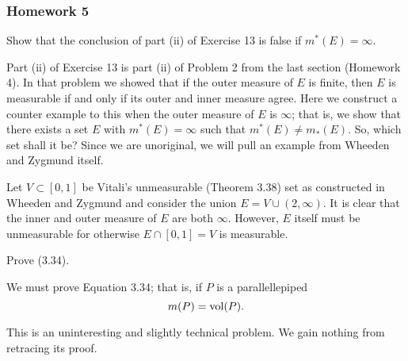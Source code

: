 \subsubsection{Homework 5}
\setcounter{exercise}{0}
\setcounter{equation}{0}

\begin{problem}
  Show that the conclusion of part (ii) of Exercise 13 is false if
  $m^*(E)=\infty$.
\end{problem}
\begin{solution}
  Part (ii) of Exercise 13 is part (ii) of Problem 2 from the last section
  (Homework 4). In that problem we showed that if the outer measure of $E$
  is finite, then $E$ is measurable if and only if its outer and inner
  measure agree. Here we construct a counter example to this when the outer
  measure of $E$ is $\infty$; that is, we show that there exists a set $E$
  with $m^*(E)=\infty$ such that $m^*(E)\neq m_*(E)$. So, which set shall
  it be? Since we are unoriginal, we will pull an example from Wheeden and
  Zygmund itself.

  Let $V\subset[0,1]$ be Vitali's unmeasurable (Theorem 3.38) set as
  constructed in Wheeden and Zygmund and consider the union
  $E=V\cup(2,\infty)$. It is clear that the inner and outer measure of $E$
  are both $\infty$. However, $E$ itself must be unmeasurable for otherwise
  $E\cap [0,1]=V$ is measurable.
\end{solution}

\begin{problem}
  Prove (3.34).
\end{problem}
\begin{solution}
  We must prove Equation 3.34; that is, if $P$ is a parallellepiped
  \[
    m(P)=\operatorname{vol}(P).
  \]

  This is an uninteresting and slightly technical problem. We gain nothing
  from retracing its proof.
\end{solution}

